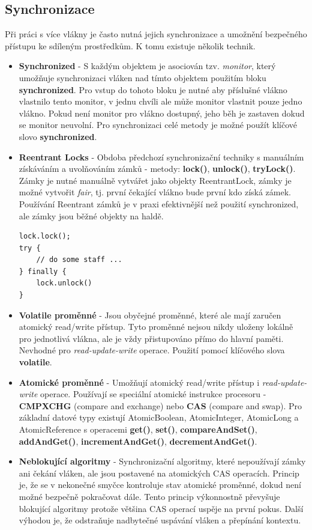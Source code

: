 \documentclass{scrreprt}
\begin{document}
\subsection{Synchronizace}
Při práci s více vlákny je často nutná jejich synchronizace a umožnění bezpečného přístupu ke sdíleným prostředkům. K tomu existuje několik technik.
\begin{itemize}
\item \textbf{Synchronized} - S každým objektem je asociován tzv. \emph{monitor}, který umožňuje synchronizaci vláken nad tímto objektem použitím bloku \textbf{synchronized}. Pro vstup do tohoto bloku je nutné aby příslušné vlákno vlastnilo tento monitor, v jednu chvíli ale může monitor vlastnit pouze jedno vlákno. Pokud není monitor pro vlákno dostupný, jeho běh je zastaven dokud se monitor neuvolní. Pro synchronizaci celé metody je možné použít klíčové slovo \textbf{synchronized}.

\item \textbf{Reentrant Locks} - Obdoba předchozí synchronizační techniky s manuálním získáváním a uvolňováním zámků - metody: \textbf{lock()}, \textbf{unlock()}, \textbf{tryLock()}. Zámky je nutné manuálně vytvářet jako objekty \textsf{ReentrantLock}, zámky je možné vytvořit \emph{fair}, tj. první čekající vlákno bude první kdo získá zámek. Používání Reentrant zámků je v praxi efektivnější než použití synchronized, ale zámky jsou běžné objekty na haldě.
\begin{verbatim}
lock.lock(); 
try {
    // do some staff ...
} finally {
    lock.unlock()
}
\end{verbatim}

\item \textbf{Volatile proměnné} - Jsou obyčejné proměnné, které ale mají zaručen atomický read/write přístup. Tyto proměnné nejsou nikdy uloženy lokálně pro jednotlivá vlákna, ale je vždy přistupováno přímo do hlavní paměti. Nevhodné pro \emph{read-update-write} operace. Použití pomocí klíčového slova \textbf{volatile}.

\item \textbf{Atomické proměnné} - Umožňují atomický read/write přístup i \emph{read-update-write} operace. Používají se speciální atomické instrukce procesoru - \textbf{CMPXCHG} (compare and exchange) nebo \textbf{CAS} (compare and swap). Pro základní datové typy existují \textsf{AtomicBoolean}, \textsf{AtomicInteger}, \textsf{AtomicLong} a \textsf{AtomicReference} s operacemi \textbf{get()}, \textbf{set()}, \textbf{compareAndSet()}, \textbf{addAndGet()}, \textbf{incrementAndGet()}, \textbf{decrementAndGet()}.

\item \textbf{Neblokující algoritmy} - Synchronizační algoritmy, které nepoužívají zámky ani čekání vláken, ale jsou postavené na atomických CAS operacích. Princip je, že se v nekonečné smyčce kontroluje stav atomické proměnné, dokud není možné bezpečně pokračovat dále. Tento princip výkonnostně převyšuje blokující algoritmy protože většina CAS operací uspěje na první pokus. Další výhodou je, že odstraňuje nadbytečné uspávání vláken a přepínání kontextu.
\end{itemize}
\end{document}
